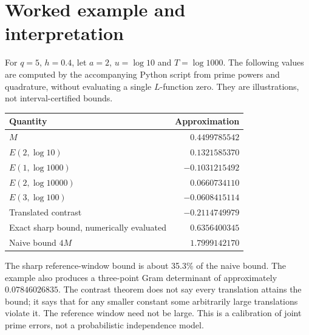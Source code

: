 \documentclass[11pt]{article}
\begin{document}
\section{Worked example and interpretation}
For $q=5$, $h=0.4$, let $a=2$, $u=\log 10$ and $T=\log 1000$. The following values are computed by the accompanying Python script from prime powers and quadrature, without evaluating a single $L$-function zero. They are illustrations, not interval-certified bounds.
\begin{center}
\begin{tabular}{lr}\toprule
Quantity & Approximation\\\midrule
$M$ & $0.4499785542$\\
$E(2,\log 10)$ & $0.1321585370$\\
$E(1,\log 1000)$ & $-0.1031215492$\\
$E(2,\log 10000)$ & $0.0660734110$\\
$E(3,\log 100)$ & $-0.0608415114$\\\midrule
Translated contrast & $-0.2114749979$\\
Exact sharp bound, numerically evaluated & $0.6356400345$\\
Naive bound $4M$ & $1.7999142170$\\\bottomrule
\end{tabular}
\end{center}
The sharp reference-window bound is about 35.3\% of the naive bound. The example also produces a three-point Gram determinant of approximately $0.07846026835$. The contrast theorem does not say every translation attains the bound; it says that for any smaller constant some arbitrarily large translations violate it. The reference window need not be large. This is a calibration of joint prime errors, not a probabilistic independence model.
\end{document}
